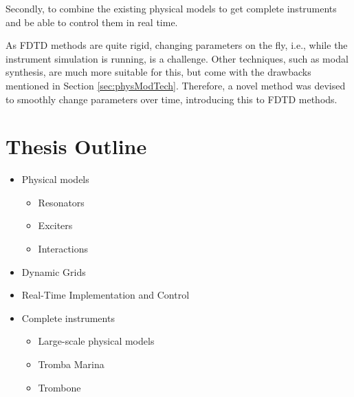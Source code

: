 Secondly, to combine the existing physical models to get complete instruments and be able to control them in real time.

As FDTD methods are quite rigid, changing parameters on the fly, i.e., while the instrument simulation is running, is a challenge.  Other techniques, such as modal synthesis, are much more suitable for this, but come with the drawbacks mentioned in Section \ref{sec:physModTech}. Therefore, a novel method was devised to smoothly change parameters over time, introducing this to FDTD methods. 

\section{Thesis Outline}
\begin{itemize}
    \item Physical models
    \begin{itemize}
        \item Resonators
        \item Exciters
        \item Interactions
    \end{itemize}
    \item Dynamic Grids
    \item Real-Time Implementation and Control
    \item Complete instruments
    \begin{itemize}
        \item Large-scale physical models
        \item Tromba Marina
        \item Trombone
    \end{itemize}
\end{itemize}